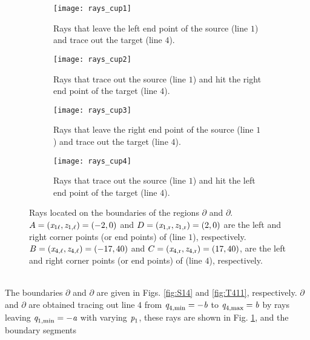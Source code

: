 \begin{figure}[h]
\centering
\begin{subfigure}{.48\textwidth}
  \centering
  \texttt{[image: rays\_cup1]}
  \caption{Rays that leave the left end point of the source (line $1$) and trace out the target (line $4$).}
  \label{fig:cup1}
\end{subfigure}%
\begin{subfigure}{.48\textwidth}
  \centering
  \texttt{[image: rays\_cup2]}
  \caption{Rays that trace out the source (line $1$) and hit the right end point of the target (line $4$).}
  \label{fig:cup2}
\end{subfigure} %
\begin{subfigure}{.48\textwidth}
  \centering
  \texttt{[image: rays\_cup3]}
  \caption{Rays that leave the right end point of the source (line $1$) and trace out the target (line $4$).}
  \label{fig:cup3}
\end{subfigure}%
\begin{subfigure}{.48\textwidth}
  \centering
  \texttt{[image: rays\_cup4]}
  \caption{Rays that trace out the source (line $1$) and hit the left end point of the target (line $4$).}
  \label{fig:cup4}
\end{subfigure}
\caption{Rays located on the boundaries of the regions $\partial$ and $\partial$.
$A = (\textit{x}_{1 \ell}, \textit{z}_{1, \ell}) =(-2, 0)$ and 
$D = (\textit{x}_{1, \textrm{r}}, \textit{z}_{1, \textrm{r}}) = (2, 0)$ 
are the left and right corner points (or end points) of
 (line $1$), respectively.
$B =  (\textit{x}_{4, \ell}, \textit{z}_{4, \ell}) = (-17, 40)$ and $C =  (\textit{x}_{4, \textrm{r}}, \textit{z}_{4, \textrm{r}}) = (17 , 40)$, are the left and right corner points (or end points) of  (line $4$), respectively.}
\label{fig:cups}
\end{figure} \\
 The boundaries $\partial$ and $\partial$ are given in Figs. \ref{fig:S14} and \ref{fig:T411}, respectively.
$\partial$ and $\partial$ are obtained tracing out line $4$ from
$\textit{q}_{4, \textrm{min}} = -\textit{b}$ to $\textit{q}_{4, \textrm{max}} = \textit{b}$
 by rays leaving $\textit{q}_{1, \textrm{min}}= -\textit{a}$ with varying $\textit{p}_1$, these rays are shown in Fig. \ref{fig:cup1}, and the boundary segments
